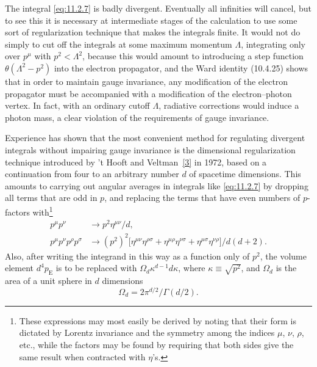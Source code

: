 The integral \eqref{eq:11.2.7} is badly divergent. Eventually all infinities will
cancel, but to see this it is necessary at intermediate stages of the
calculation to use some sort of regularization technique that makes the
integrals finite. It would not do simply to cut off the integrals at some
maximum momentum $\Lambda$, integrating only over $p^\mu$ with
$p^2<\Lambda^2$, because this would amount to introducing a step function
$\theta(\Lambda^2-p^2)$ into the electron propagator, and the Ward identity
(10.4.25) shows that in order to maintain gauge invariance, any modification
of the electron propagator must be accompanied with a modification of the
electron--photon vertex. In fact, with an ordinary cutoff $\Lambda$, radiative
corrections would induce a photon mass, a clear violation of the requirements
of gauge invariance.

Experience has shown that the most convenient method for regulating
divergent integrals without impairing gauge invariance is the dimensional
regularization technique introduced by 't Hooft and Veltman~\hyperref[ref:11.3]{[3]} in 1972,
based on a continuation from four to an arbitrary number $d$ of spacetime
dimensions. This amounts to carrying out angular averages in integrals
like \eqref{eq:11.2.7} by dropping all terms that are odd in $p$, and replacing the
terms that have even numbers of $p$-factors with\footnote{These expressions
may most easily be derived by noting that their form is dictated by Lorentz
invariance and the symmetry among the indices $\mu$, $\nu$, $\rho$, etc.,
while the factors may be found by requiring that both sides give the same
result when contracted with $\eta$'s.}
\begin{align}
  p^\mu p^\nu&\longrightarrow p^2\eta^{\mu\nu}/d,
  \tag{11.2.8}\label{eq:11.2.8}\\
  p^\mu p^\nu p^\rho p^\sigma&\longrightarrow
  (p^2)^2\bigl[\eta^{\mu\nu}\eta^{\rho\sigma}
  +\eta^{\mu\rho}\eta^{\nu\sigma}
  +\eta^{\mu\sigma}\eta^{\nu\rho}\bigr]/d(d+2).
  \tag{11.2.9}\label{eq:11.2.9}
\end{align}
Also, after writing the integrand in this way as a function only of $p^2$,
the volume element $d^4p_{\mathrm E}$ is to be replaced with
$\Omega_d\kappa^{d-1}d\kappa$, where $\kappa\equiv\sqrt{p^2}$, and
$\Omega_d$ is the area of a unit sphere in $d$ dimensions
\begin{equation}
  \Omega_d=2\pi^{d/2}/\Gamma(d/2).
  \tag{11.2.10}\label{eq:11.2.10}
\end{equation}

